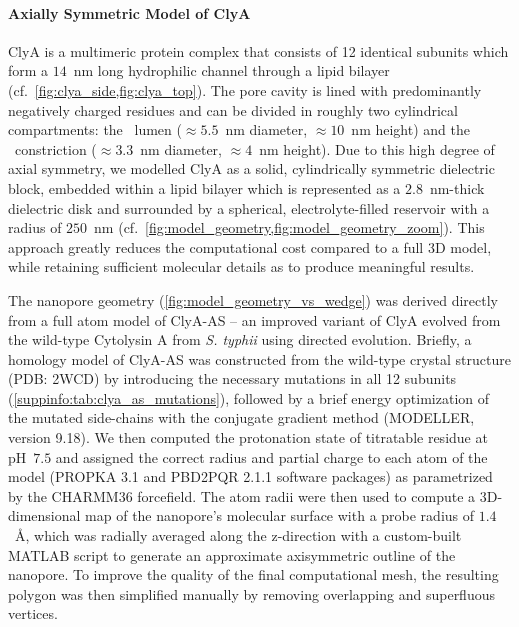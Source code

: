 \documentclass[journal=ancac3,manuscript=article,etalmode=truncate,maxauthors=0,layout=twocolumn]{achemso}
\begin{document}
\paragraph{Axially Symmetric Model of ClyA}
ClyA is a multimeric protein complex that consists of 12 identical subunits which form a $14$~nm long 
hydrophilic channel through a lipid bilayer (cf.~\cref{fig:clya_side,fig:clya_top}). The pore cavity is lined 
with predominantly negatively charged residues and can be divided in roughly two cylindrical compartments: 
the \cis\ lumen ($\approx5.5$~nm diameter, $\approx10$~nm height) and the \trans\ constriction 
($\approx3.3$~nm diameter, $\approx4$~nm height). Due to this high degree of axial symmetry, we modelled ClyA 
as a solid, cylindrically symmetric dielectric block, embedded within a lipid bilayer which is represented as 
a $2.8$~nm-thick\cite{Kucerka-2011} dielectric disk  and surrounded by a spherical, electrolyte-filled 
reservoir with a radius of $250$~nm 
(cf.~\cref{fig:model_geometry,fig:model_geometry_zoom})\cite{Lu-2012,Pederson-2015}. This approach greatly 
reduces the computational cost compared to a full 3D model, while retaining sufficient molecular details as 
to produce meaningful results.

The nanopore geometry (\cref{fig:model_geometry_vs_wedge}) was derived directly from a full atom model of 
ClyA-AS -- an improved variant of ClyA evolved from the wild-type Cytolysin A from \textit{S. typhii} using 
directed evolution.\cite{Soskine-2013} Briefly, a homology model of ClyA-AS was constructed from the 
wild-type crystal structure (PDB: 2WCD)\cite{Mueller-2009} by introducing the necessary mutations in all 12 
subunits (\cref{suppinfo:tab:clya_as_mutations}), followed by a brief energy optimization of the mutated 
side-chains with the conjugate gradient method (MODELLER, version 9.18).\cite{Sali-1993} We then computed the 
protonation state of titratable residue at pH~$7.5$ and assigned the correct radius and partial charge to 
each atom of the model (PROPKA 3.1\cite{Olsson-2011} and PBD2PQR 2.1.1\cite{Jurrus-2018} software packages) 
as parametrized by the CHARMM36 forcefield.\cite{Best-2012} The atom radii were then used to compute a 
3D-dimensional map of the nanopore's molecular surface with a probe radius of $1.4$~\AA, which was radially 
averaged along the z-direction with a custom-built MATLAB script to generate an approximate axisymmetric 
outline of the nanopore. To improve the quality of the final computational mesh, the resulting polygon was 
then simplified manually by removing overlapping and superfluous vertices.
\end{document}

